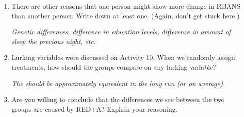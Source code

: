 \begin{enumerate}
\begin{enumerate}
 \item  Below the plot, keep    and  enter the
   {\bf observed difference in means from the original data} in the
   last box.  Click . What proportion of the samples are this
   extreme?   
\begin{students}
    \vspace{2cm}    
\end{students}

\begin{key}
  {\it 0.008 in my sample. }
\end{key}

   \end{enumerate}

 \item  There are other reasons that one person might show more change
   in RBANS than another person.  Write down at least one. (Again,
   don't get stuck here.) 
\begin{students}
    \vspace{2cm}    
\end{students}

\begin{key}
  {\it   Genetic differences, difference in education levels, difference
     in amount of sleep the previous night, etc. 
}
\end{key}
\vspace{6cm}

 \item  Lurking variables were discussed on Activity 10.  When we
   randomly assign treatments, how should the groups compare on any
   lurking variable? 
\begin{students}
    \vspace{3cm}    
\end{students}

\begin{key}
  {\it  The should be approximately equivalent in the long run (or on average). }
\end{key}
   
 \item  Are you willing to conclude that the differences we see
   between the two groups are caused by RED+A?  Explain
   your reasoning. 
\begin{students}
    \vspace{4cm}    
\end{students}


\end{enumerate}
